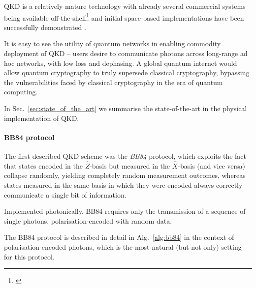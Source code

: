QKD is a relatively mature technology with already several commercial systems being available off-the-shelf\footnote{\cite{??? example companies}} and initial space-based implementations have been successfully demonstrated \cite{Pan}.

It is easy to see the utility of quantum networks in enabling commodity deployment of QKD -- users desire to communicate photons across long-range ad hoc networks, with low loss and dephasing. A global quantum internet would allow quantum cryptography to truly supersede classical cryptography, bypassing the vulnerabilities faced by classical cryptography in the era of quantum computing.

In Sec.~\ref{sec:state_of_the_art} we summarise the state-of-the-art in the physical implementation of QKD.

%
%

\paragraph{BB84 protocol}

The first described QKD scheme was the \textit{BB84} \cite{bib:BennetBrassard84} protocol, which exploits the fact that states encoded in the $\hat{Z}$-basis but measured in the $\hat{X}$-basis (and vice versa) collapse randomly, yielding completely random measurement outcomes, whereas states measured in the same basis in which they were encoded always correctly communicate a single bit of information.

Implemented photonically, BB84 requires only the transmission of a sequence of single photons, polarisation-encoded with random data.

The BB84 protocol is described in detail in Alg.~\ref{alg:bb84} in the context of polarisation-encoded photons, which is the most natural (but not only) setting for this protocol.

